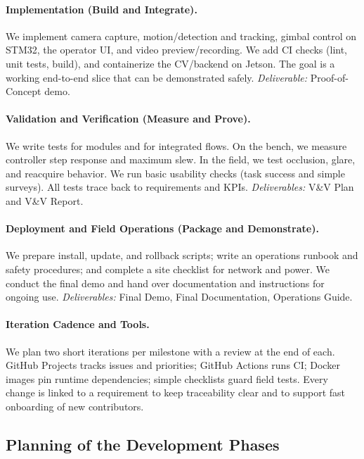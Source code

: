 \documentclass[12pt]{article}
\begin{document}
\paragraph{Implementation (Build and Integrate).}
We implement camera capture, motion/detection and tracking, gimbal control on
STM32, the operator UI, and video preview/recording. We add CI checks (lint,
unit tests, build), and containerize the CV/backend on Jetson. The goal is a
working end-to-end slice that can be demonstrated safely. \emph{Deliverable:}
Proof-of-Concept demo.

\paragraph{Validation and Verification (Measure and Prove).}
We write tests for modules and for integrated flows. On the bench, we measure
controller step response and maximum slew. In the field, we test occlusion,
glare, and reacquire behavior. We run basic usability checks (task success and
simple surveys). All tests trace back to requirements and KPIs.
\emph{Deliverables:} V\&V Plan and V\&V Report.

\paragraph{Deployment and Field Operations (Package and Demonstrate).}
We prepare install, update, and rollback scripts; write an operations runbook
and safety procedures; and complete a site checklist for network and power. We
conduct the final demo and hand over documentation and instructions for ongoing
use. \emph{Deliverables:} Final Demo, Final Documentation, Operations Guide.

\paragraph{Iteration Cadence and Tools.}
We plan two short iterations per milestone with a review at the end of each.
GitHub Projects tracks issues and priorities; GitHub Actions runs CI; Docker
images pin runtime dependencies; simple checklists guard field tests. Every
change is linked to a requirement to keep traceability clear and to support
fast onboarding of new contributors.

\subsection{Planning of the Development Phases}
\end{document}
